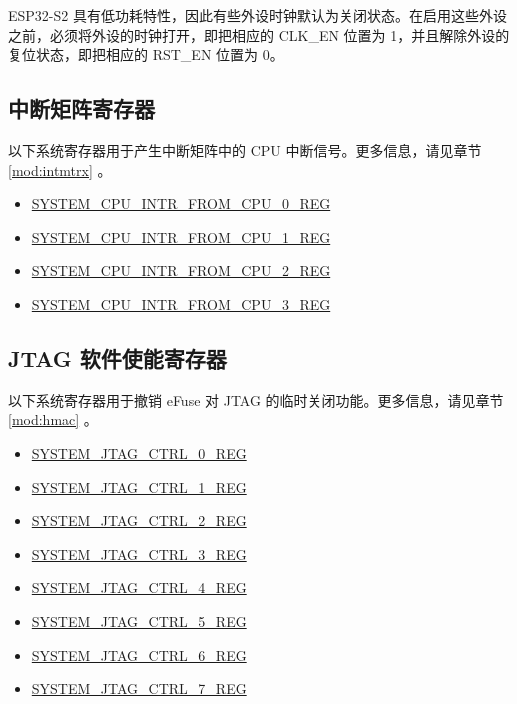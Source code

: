 \documentclass[main\_\_CN.tex]{subfiles}
\begin{document}
\begin{tiplisting}
ESP32-S2 具有低功耗特性，因此有些外设时钟默认为关闭状态。在启用这些外设之前，必须将外设的时钟打开，即把相应的 CLK\_EN 位置为 1，并且解除外设的复位状态，即把相应的 RST\_EN 位置为 0。
\end{tiplisting}


\subsection{中断矩阵寄存器}

以下系统寄存器用于产生中断矩阵中的 CPU 中断信号。更多信息，请见章节 \ref{mod:intmtrx}
\textit{}。

\begin{itemize}
    \item \hyperref[fielddesc:SYSTEMCPUINTRFROMCPU0]{SYSTEM\_CPU\_INTR\_FROM\_CPU\_0\_REG}
    \item \hyperref[fielddesc:SYSTEMCPUINTRFROMCPU1]{SYSTEM\_CPU\_INTR\_FROM\_CPU\_1\_REG}
    \item \hyperref[fielddesc:SYSTEMCPUINTRFROMCPU2]{SYSTEM\_CPU\_INTR\_FROM\_CPU\_2\_REG}
    \item \hyperref[fielddesc:SYSTEMCPUINTRFROMCPU3]{SYSTEM\_CPU\_INTR\_FROM\_CPU\_3\_REG}
\end{itemize}

\subsection{JTAG 软件使能寄存器}

以下系统寄存器用于撤销 eFuse 对 JTAG 的临时关闭功能。更多信息，请见章节 \ref{mod:hmac} \textit{}。

\begin{itemize}
    \item \hyperref[regdesc:SYSTEMJTAGCTRL0REG]{SYSTEM\_JTAG\_CTRL\_0\_REG}
    \item \hyperref[regdesc:SYSTEMJTAGCTRL1REG]{SYSTEM\_JTAG\_CTRL\_1\_REG}
    \item \hyperref[regdesc:SYSTEMJTAGCTRL2REG]{SYSTEM\_JTAG\_CTRL\_2\_REG}
    \item \hyperref[regdesc:SYSTEMJTAGCTRL3REG]{SYSTEM\_JTAG\_CTRL\_3\_REG}
    \item \hyperref[regdesc:SYSTEMJTAGCTRL4REG]{SYSTEM\_JTAG\_CTRL\_4\_REG}
    \item \hyperref[regdesc:SYSTEMJTAGCTRL5REG]{SYSTEM\_JTAG\_CTRL\_5\_REG}
    \item \hyperref[regdesc:SYSTEMJTAGCTRL6REG]{SYSTEM\_JTAG\_CTRL\_6\_REG}
    \item \hyperref[regdesc:SYSTEMJTAGCTRL7REG]{SYSTEM\_JTAG\_CTRL\_7\_REG}
\end{itemize}
\end{document}
